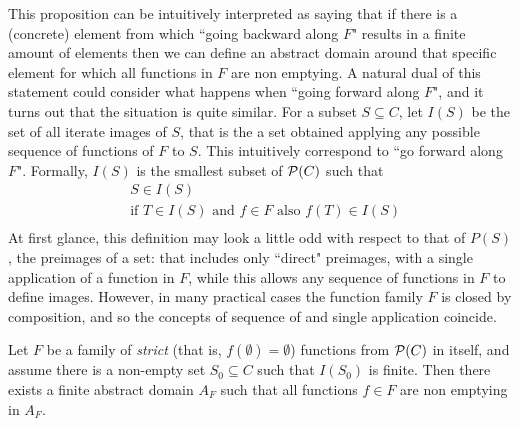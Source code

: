 This proposition can be intuitively interpreted as saying that if there is a (concrete) element from which ``going backward along $F$" results in a finite amount of elements then we can define an abstract domain around that specific element for which all functions in $F$ are non emptying.
A natural dual of this statement could consider what happens when ``going forward along $F$", and it turns out that the situation is quite similar.
For a subset $S \subseteq C$, let $I(S)$ be the set of all iterate images of $S$, that is the a set obtained applying any possible sequence of functions of $F$ to $S$. This intuitively correspond to ``go forward along $F$". Formally, $I(S)$ is the smallest subset of $\mathcal{P}(C)$ such that
\begin{align*}
	&S \in I(S) \\
	&\text{if } T \in I(S)\text{ and }f \in F\text{ also } f(T) \in I(S)\\
\end{align*}
At first glance, this definition may look a little odd with respect to that of $P(S)$, the preimages of a set: that includes only ``direct" preimages, with a single application of a function in $F$, while this allows any sequence of functions in $F$ to define images. However, in many practical cases the function family $F$ is closed by composition, and so the concepts of sequence of and single application coincide.
\begin{prop}\label{ch4:th:existence-finte-forward}
	Let $F$ be a family of \textit{strict} (that is, $f(\emptyset) = \emptyset$) functions from $\mathcal{P}(C)$ in itself, and assume there is a non-empty set $S_0 \subseteq C$ such that $I(S_0)$ is finite. Then there exists a finite abstract domain $A_F$ such that all functions $f \in F$ are non emptying in $A_F$.
\end{prop}
